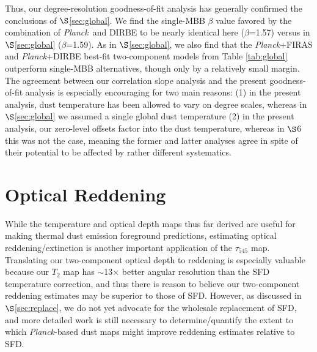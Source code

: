 \documentclass{emulateapj}
\newcommand{\PLANCK}{{\it Planck}}
\begin{document}
Thus, our degree-resolution goodness-of-fit analysis has generally confirmed
the conclusions of $\S$\ref{sec:global}. We find the single-MBB $\beta$ value 
favored by the combination of \PLANCK~and DIRBE to be nearly identical here 
($\beta$=1.57) versus in $\S$\ref{sec:global} ($\beta$=1.59). As in 
$\S$\ref{sec:global}, we also find that the \PLANCK+FIRAS and \PLANCK+DIRBE 
best-fit two-component models from Table \ref{tab:global} outperform single-MBB
alternatives, though only by a relatively small margin. The agreement between 
our correlation slope analysis and the present goodness-of-fit analysis is 
especially encouraging for two main reasons: (1) in the present analysis, dust 
temperature has been allowed to vary on degree scales, whereas in 
$\S$\ref{sec:global} we assumed a single global dust temperature (2) in the
present analysis, our zero-level offsets factor into the dust temperature,
whereas in $\S$6 this was not the case, meaning the former and latter analyses 
agree in spite of their potential to be affected by rather different 
systematics.



\section{Optical Reddening}
\label{sec:ebv}

While the temperature and optical depth maps thus far derived are
useful for making thermal dust emission foreground predictions, estimating 
optical reddening/extinction is another important application of the 
$\tau_{545}$ map. Translating our two-component optical depth to reddening
is especially valuable because our $T_2$ map has $\sim$13$\times$ better
angular resolution than the SFD temperature correction, and thus there is 
reason to believe our two-component reddening estimates may be superior to
those of SFD. However, as discussed in $\S$\ref{sec:replace}, we do not yet 
advocate for the wholesale replacement of SFD, and more detailed work is still 
necessary to determine/quantify the extent to which \PLANCK-based dust maps
might improve reddening estimates relative to SFD.

\end{document}
